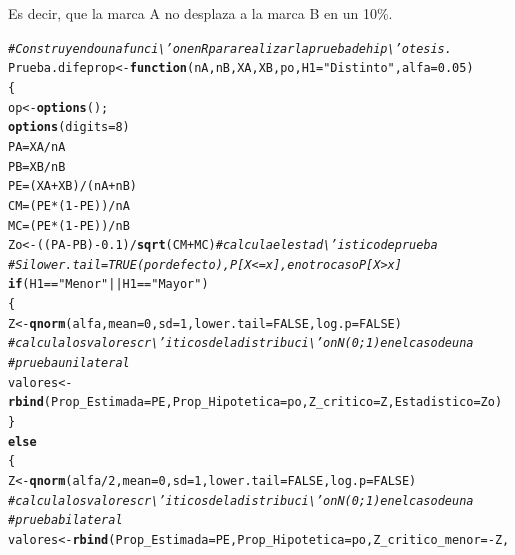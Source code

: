 \documentclass[12pt,letterpaper]{article}\usepackage[]{graphicx}\usepackage[]{color}
\makeatletter
\newcommand{\hlnum}[1]{\textcolor[rgb]{0.686,0.059,0.569}{#1}}%
\newcommand{\hlstr}[1]{\textcolor[rgb]{0.192,0.494,0.8}{#1}}%
\newcommand{\hlcom}[1]{\textcolor[rgb]{0.678,0.584,0.686}{\textit{#1}}}%
\newcommand{\hlopt}[1]{\textcolor[rgb]{0,0,0}{#1}}%
\newcommand{\hlstd}[1]{\textcolor[rgb]{0.345,0.345,0.345}{#1}}%
\newcommand{\hlkwa}[1]{\textcolor[rgb]{0.161,0.373,0.58}{\textbf{#1}}}%
\newcommand{\hlkwb}[1]{\textcolor[rgb]{0.69,0.353,0.396}{#1}}%
\newcommand{\hlkwc}[1]{\textcolor[rgb]{0.333,0.667,0.333}{#1}}%
\newcommand{\hlkwd}[1]{\textcolor[rgb]{0.737,0.353,0.396}{\textbf{#1}}}%
\newenvironment{kframe}{%
 \def\at@end@of@kframe{}%
 \ifinner\ifhmode%
  \def\at@end@of@kframe{\end{minipage}}%
  \begin{minipage}{\columnwidth}%
 \fi\fi%
 \def\FrameCommand##1{\hskip\@totalleftmargin \hskip-\fboxsep
 \colorbox{shadecolor}{##1}\hskip-\fboxsep
     \hskip-\linewidth \hskip-\@totalleftmargin \hskip\columnwidth}%
 \MakeFramed {\advance\hsize-\width
   \@totalleftmargin\z@ \linewidth\hsize
   \@setminipage}}%
 {\par\unskip\endMakeFramed%
 \at@end@of@kframe}
\newenvironment{knitrout}{}{} %
\makeatother
\begin{document}
Es decir, que la marca A no desplaza a la marca B en un 10\%.
\begin{knitrout}
\color{fgcolor}\begin{kframe}
\begin{alltt}
\hlcom{# Construyendo una funci\textbackslash{}'on en R para realizar la prueba de hip\textbackslash{}'otesis.}
\hlstd{Prueba.difeprop} \hlkwb{<-} \hlkwa{function}\hlstd{(}\hlkwc{nA}\hlstd{,} \hlkwc{nB}\hlstd{,} \hlkwc{XA}\hlstd{,} \hlkwc{XB}\hlstd{,} \hlkwc{po}\hlstd{,} \hlkwc{H1}\hlstd{=}\hlstr{"Distinto"}\hlstd{,} \hlkwc{alfa}\hlstd{=}\hlnum{0.05}\hlstd{)}
\hlstd{\{}
\hlstd{op} \hlkwb{<-} \hlkwd{options}\hlstd{();}
\hlkwd{options}\hlstd{(}\hlkwc{digits}\hlstd{=}\hlnum{8}\hlstd{)}
\hlstd{PA} \hlkwb{=} \hlstd{XA}\hlopt{/}\hlstd{nA}
\hlstd{PB} \hlkwb{=} \hlstd{XB}\hlopt{/}\hlstd{nB}
\hlstd{PE} \hlkwb{=} \hlstd{(XA} \hlopt{+} \hlstd{XB)}\hlopt{/}\hlstd{(nA} \hlopt{+} \hlstd{nB)}
\hlstd{CM} \hlkwb{=} \hlstd{(PE}\hlopt{*}\hlstd{(}\hlnum{1} \hlopt{-} \hlstd{PE))}\hlopt{/}\hlstd{nA}
\hlstd{MC} \hlkwb{=} \hlstd{(PE}\hlopt{*}\hlstd{(}\hlnum{1} \hlopt{-} \hlstd{PE))}\hlopt{/}\hlstd{nB}
\hlstd{Zo} \hlkwb{<-} \hlstd{((PA} \hlopt{-} \hlstd{PB)} \hlopt{-} \hlnum{0.1}\hlstd{)} \hlopt{/}\hlkwd{sqrt}\hlstd{(CM} \hlopt{+} \hlstd{MC)} \hlcom{#calcula el estad\textbackslash{}'istico de prueba }
\hlcom{# Si lower.tail = TRUE (por defecto), P[X <= x], en otro caso P[X > x] }
\hlkwa{if} \hlstd{(H1} \hlopt{==} \hlstr{"Menor"} \hlopt{||} \hlstd{H1} \hlopt{==} \hlstr{"Mayor"}\hlstd{)}
\hlstd{\{}
\hlstd{Z} \hlkwb{<-} \hlkwd{qnorm}\hlstd{(alfa,} \hlkwc{mean}\hlstd{=}\hlnum{0}\hlstd{,} \hlkwc{sd}\hlstd{=}\hlnum{1}\hlstd{,} \hlkwc{lower.tail} \hlstd{=} \hlnum{FALSE}\hlstd{,} \hlkwc{log.p} \hlstd{=} \hlnum{FALSE}\hlstd{)}
\hlcom{# calcula los valores cr\textbackslash{}'iticos de la distribuci\textbackslash{}'on N(0;1) en el caso de una }
\hlcom{# prueba unilateral }
\hlstd{valores} \hlkwb{<-} \hlkwd{rbind}\hlstd{(}\hlkwc{Prop_Estimada}\hlstd{=PE,} \hlkwc{Prop_Hipotetica}\hlstd{=po,} \hlkwc{Z_critico}\hlstd{=Z,}\hlkwc{Estadistico}\hlstd{= Zo)}
\hlstd{\}}
\hlkwa{else}
\hlstd{\{}
\hlstd{Z} \hlkwb{<-} \hlkwd{qnorm}\hlstd{(alfa}\hlopt{/}\hlnum{2}\hlstd{,} \hlkwc{mean}\hlstd{=}\hlnum{0}\hlstd{,} \hlkwc{sd}\hlstd{=}\hlnum{1}\hlstd{,} \hlkwc{lower.tail} \hlstd{=} \hlnum{FALSE}\hlstd{,} \hlkwc{log.p} \hlstd{=} \hlnum{FALSE}\hlstd{)}
\hlcom{# calcula los valores cr\textbackslash{}'iticos de la distribuci\textbackslash{}'on N(0;1) en el caso de una }
\hlcom{# prueba  bilateral }
\hlstd{valores} \hlkwb{<-} \hlkwd{rbind}\hlstd{(}\hlkwc{Prop_Estimada}\hlstd{=PE,} \hlkwc{Prop_Hipotetica} \hlstd{=po,} \hlkwc{Z_critico_menor}\hlstd{=}\hlopt{-}\hlstd{Z,}

\end{alltt}
\end{kframe}
\end{knitrout}
\end{document}
